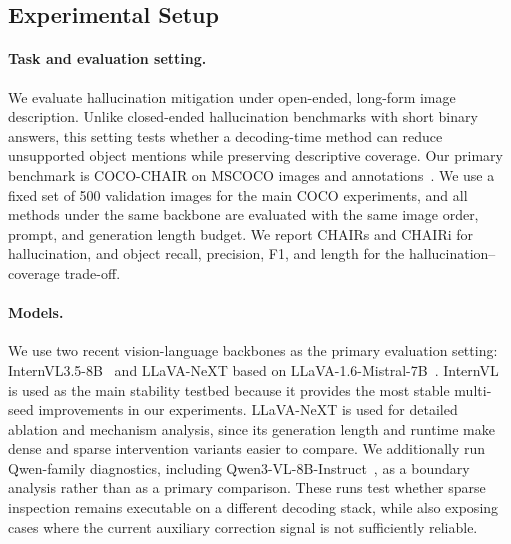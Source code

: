 \documentclass[11pt]{article}
\begin{document}
\subsection{Experimental Setup}

  \paragraph{Task and evaluation setting.}
  We evaluate hallucination mitigation under open-ended, long-form image description.
  Unlike closed-ended hallucination benchmarks with short binary answers, this setting tests whether a decoding-time method can reduce unsupported object mentions while preserving descriptive coverage.
  Our primary benchmark is COCO-CHAIR on MSCOCO images and annotations~\citep{rohrbach-etal-2018-object,DBLP:conf/eccv/LinMBHPRDZ14}.
  We use a fixed set of 500 validation images for the main COCO experiments, and all methods under the same backbone are evaluated with the same image order, prompt, and generation length budget.
  We report CHAIRs and CHAIRi for hallucination, and object recall, precision, F1, and length for the hallucination--coverage trade-off.

  \paragraph{Models.}
  We use two recent vision-language backbones as the primary evaluation setting: InternVL3.5-8B~\citep{wang2025internvl35advancingopensourcemultimodal} and LLaVA-NeXT based on LLaVA-1.6-Mistral-7B~\citep{liu2024llavanext}.
  InternVL is used as the main stability testbed because it provides the most stable multi-seed improvements in our experiments.
  LLaVA-NeXT is used for detailed ablation and mechanism analysis, since its generation length and runtime make dense and sparse intervention variants easier to compare.
  We additionally run Qwen-family diagnostics, including Qwen3-VL-8B-Instruct~\citep{bai2025qwen3vltechnicalreport}, as a boundary analysis rather than as a primary comparison. These runs test whether sparse inspection remains executable on a different decoding stack, while also exposing cases where the current auxiliary correction signal is not sufficiently reliable.
\end{document}
